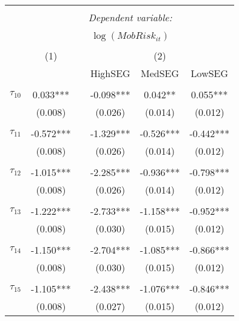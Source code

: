 \begin{tabular}{@{\extracolsep{-0pt}}lccccc} 
\\[-1.8ex]\hline 
\hline \\[-1.8ex] 
 & \multicolumn{5}{c}{\textit{Dependent variable:}} \\ 
\cline{2-6} 
\\[-1.8ex] & \multicolumn{5}{c}{$\log(MobRisk_{it})$}\\ 
\\[-1.8ex] & (1) && \multicolumn{3}{c}{(2)} \\ 
\cline{2-2}\cline{4-6}
        &&& HighSEG & MedSEG & LowSEG  \\
 \\[-1.8ex] 
$\tau_{10}$     &  0.033*** && -0.098*** &  0.042**  & 0.055***  \\
                &  (0.008)  &&  (0.026)  &  (0.014)  &  (0.012)  \\
                &           &&           &           &           \\[-2.1ex]
$\tau_{11}$     & -0.572*** && -1.329*** & -0.526*** & -0.442*** \\
                &  (0.008)  &&  (0.026)  &  (0.014)  &  (0.012)  \\
                &           &&           &           &           \\[-2.1ex]
$\tau_{12}$     & -1.015*** && -2.285*** & -0.936*** & -0.798*** \\
                &  (0.008)  &&  (0.026)  &  (0.014)  &  (0.012)  \\
                &           &&           &           &           \\[-2.1ex]
$\tau_{13}$     & -1.222*** && -2.733*** & -1.158*** & -0.952*** \\
                &  (0.008)  &&  (0.030)  &  (0.015)  &  (0.012)  \\
                &           &&           &           &           \\[-2.1ex]
$\tau_{14}$     & -1.150*** && -2.704*** & -1.085*** & -0.866*** \\
                &  (0.008)  &&  (0.030)  &  (0.015)  &  (0.012)  \\
                &           &&           &           &           \\[-2.1ex]
$\tau_{15}$     & -1.105*** && -2.438*** & -1.076*** & -0.846*** \\
                &  (0.008)  &&  (0.027)  &  (0.015)  &  (0.012)  \\

\end{tabular}
